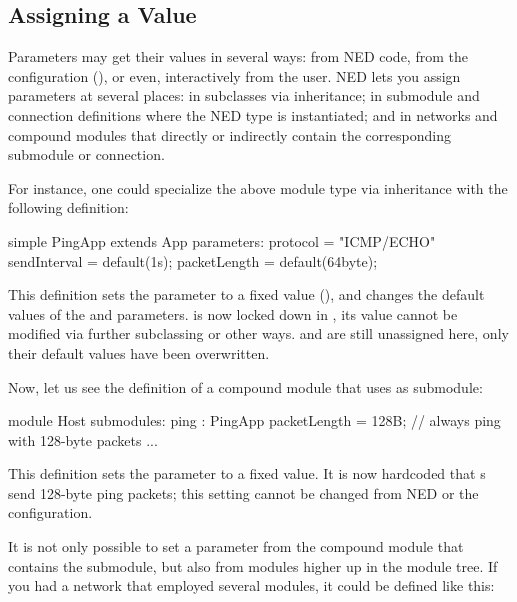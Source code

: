 \subsection{Assigning a Value}
\label{sec:ned-lang:parameter-assignments}

Parameters may get their values in several ways: from NED code, from the
configuration (), or even, interactively from the
user. NED lets you assign parameters at several places: in subclasses via
inheritance; in submodule and connection definitions where the NED type is
instantiated; and in networks and compound modules that directly or
indirectly contain the corresponding submodule or connection.

For instance, one could specialize the above  module type via
inheritance with the following definition:

\begin{ned}
simple PingApp extends App
{
    parameters:
        protocol = "ICMP/ECHO"
        sendInterval = default(1s);
        packetLength = default(64byte);
}
\end{ned}

This definition sets the  parameter to a fixed value
(), and changes the default values of the
 and  parameters.  is now
locked down in , its value cannot be modified via further subclassing
or other ways.  and  are still unassigned
here, only their default values have been overwritten.

Now, let us see the definition of a  compound module that uses
 as submodule:

\begin{ned}
module Host
{
    submodules:
        ping : PingApp {
            packetLength = 128B; // always ping with 128-byte packets
        }
        ...
}
\end{ned}

This definition sets the  parameter to a fixed value. It
is now hardcoded that s send 128-byte ping packets; this
setting cannot be changed from NED or the configuration.

It is not only possible to set a parameter from the compound module that
contains the submodule, but also from modules higher up in the module tree.
If you had a network that employed several  modules, it could be
defined like this:

